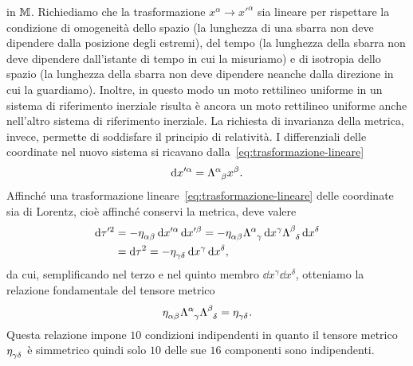 in $\mathbb{M}$.  Richiediamo che la trasformazione
$x^{\alpha} \to x'^{\alpha}$ sia lineare per rispettare la condizione di
omogeneità dello spazio (la lunghezza di una sbarra non deve dipendere dalla
posizione degli estremi), del tempo (la lunghezza della sbarra non deve
dipendere dall'istante di tempo in cui la misuriamo) e di isotropia dello spazio
(la lunghezza della sbarra non deve dipendere neanche dalla direzione in cui la
guardiamo).  Inoltre, in questo modo un moto rettilineo uniforme in un sistema
di riferimento inerziale risulta è ancora un moto rettilineo uniforme anche
nell'altro sistema di riferimento inerziale.  La richiesta di invarianza della
metrica, invece, permette di soddisfare il principio di relatività.  I
differenziali delle coordinate nel nuovo sistema si ricavano
dalla~\eqref{eq:trasformazione-lineare}
\begin{equation}
  \label{eq:trasformazione-differenziali}
  \dd x'^{\alpha} = \tensor{\Lambda}{^{\alpha}_{\beta}}x^{\beta}.
\end{equation}
Affinché una trasformazione lineare~\eqref{eq:trasformazione-lineare} delle
coordinate sia di Lorentz, cioè affinché conservi la metrica, deve valere
\begin{equation}
  \begin{split}
    \dd \tau'^{2} &= -\tensor{\eta}{_{\alpha\beta}}\dd x'^{\alpha}\dd x'^{\beta}
    = -\tensor{\eta}{_{\alpha\beta}} \tensor{\Lambda}{^{\alpha}_{\gamma}} \dd
    x^{\gamma} \tensor{\Lambda}{^{\beta}_{\delta}} \dd x^{\delta} \\
    &= \dd \tau^{2} = -\tensor{\eta}{_{\gamma\delta}} \dd x^{\gamma} \dd x^{\delta},
  \end{split}
\end{equation}
da cui, semplificando nel terzo e nel quinto membro
$\dd x^{\gamma}\dd x^{\delta}$, otteniamo la relazione fondamentale del tensore
metrico
\begin{equation}
  \label{eq:rel-fond-tensore-metrico}
  \tensor{\eta}{_{\alpha\beta}} \tensor{\Lambda}{^{\alpha}_{\gamma}}
  \tensor{\Lambda}{^{\beta}_{\delta}} = \tensor{\eta}{_{\gamma\delta}}.
\end{equation}
Questa relazione impone $10$ condizioni indipendenti in quanto il tensore
metrico $\tensor{\eta}{_{\gamma\delta}}$ è simmetrico quindi solo $10$ delle sue
$16$ componenti sono indipendenti.

